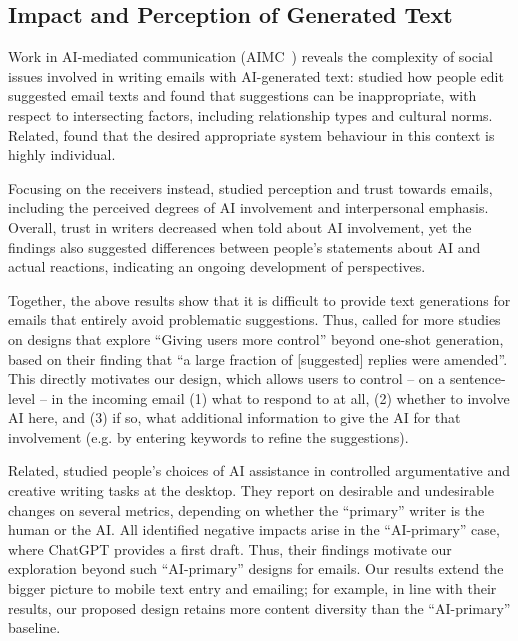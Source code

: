 \subsection{Impact and Perception of Generated Text}

Work in AI-mediated communication (AIMC~\cite{Hancock2020aimc}) reveals the complexity of social issues involved in writing emails with AI-generated text: \citet{Robertson2021cantreply} studied how people edit suggested email texts and found that suggestions can be inappropriate, with respect to intersecting factors, including relationship types and cultural norms. 
Related, \citet{lucy2024onesizefitsall} found that the desired appropriate system behaviour in this context is highly individual. 

Focusing on the receivers instead, \citet{Liu2022aimailperception} studied perception and trust towards emails, including the perceived degrees of AI involvement and interpersonal emphasis. Overall, trust in writers decreased when told about AI involvement, yet the findings also suggested differences between people's statements about AI and actual reactions, indicating an ongoing development of perspectives.

Together, the above results show that it is difficult to provide text generations for emails that entirely avoid problematic suggestions. Thus, \citet{Robertson2021cantreply} called for more studies on designs that explore ``Giving users more control'' beyond one-shot generation, based on their finding that ``a large fraction of [suggested] replies were amended''. This directly motivates our design, which allows users to control -- on a sentence-level -- in the incoming email (1) what to respond to at all, (2) whether to involve AI here, and (3) if so, what additional information to give the AI for that involvement (e.g. by entering keywords to refine the suggestions). %


Related, \citet{Li2024aivalue} studied people’s choices of AI assistance in controlled argumentative and creative writing tasks at the desktop. They report on desirable and undesirable changes on several metrics, depending on whether the ``primary'' writer is the human or the AI. %
All identified negative impacts arise in the ``AI-primary'' case, where ChatGPT provides a first draft. %
Thus, their findings  motivate our exploration beyond such ``AI-primary'' designs for emails. %
Our results extend the bigger picture to mobile text entry and emailing; for example, in line with their results, our proposed design retains more content diversity than the ``AI-primary'' baseline.







